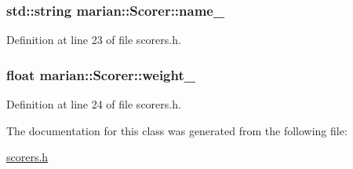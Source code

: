 \subsubsection[{\texorpdfstring{name\+\_\+}{name_}}]{\setlength{\rightskip}{0pt plus 5cm}std\+::string marian\+::\+Scorer\+::name\+\_\+\hspace{0.3cm}{\ttfamily [protected]}}\hypertarget{classmarian_1_1Scorer_ae335e429e353988826978741f41e3c3b}{}\label{classmarian_1_1Scorer_ae335e429e353988826978741f41e3c3b}


Definition at line 23 of file scorers.\+h.

\subsubsection[{\texorpdfstring{weight\+\_\+}{weight_}}]{\setlength{\rightskip}{0pt plus 5cm}float marian\+::\+Scorer\+::weight\+\_\+\hspace{0.3cm}{\ttfamily [protected]}}\hypertarget{classmarian_1_1Scorer_aa46033c062f31ba15b16066b63d83a39}{}\label{classmarian_1_1Scorer_aa46033c062f31ba15b16066b63d83a39}


Definition at line 24 of file scorers.\+h.



The documentation for this class was generated from the following file\+:\begin{DoxyCompactItemize}
\item 
\hyperlink{scorers_8h}{scorers.\+h}\end{DoxyCompactItemize}

